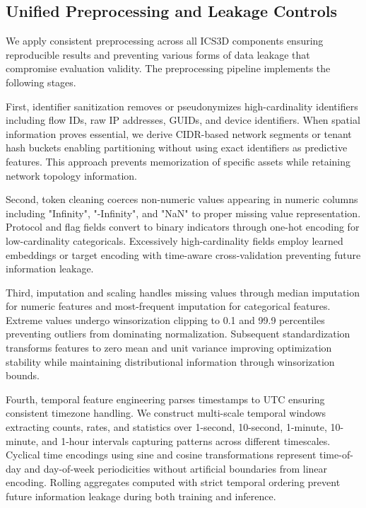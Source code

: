 \documentclass[10pt,journal,compsoc]{IEEEtran}
\begin{document}
\subsection{Unified Preprocessing and Leakage Controls}

We apply consistent preprocessing across all ICS3D components ensuring reproducible results and preventing various forms of data leakage that compromise evaluation validity. The preprocessing pipeline implements the following stages.

First, identifier sanitization removes or pseudonymizes high-cardinality identifiers including flow IDs, raw IP addresses, GUIDs, and device identifiers. When spatial information proves essential, we derive CIDR-based network segments or tenant hash buckets enabling partitioning without using exact identifiers as predictive features. This approach prevents memorization of specific assets while retaining network topology information.

Second, token cleaning coerces non-numeric values appearing in numeric columns including "Infinity", "-Infinity", and "NaN" to proper missing value representation. Protocol and flag fields convert to binary indicators through one-hot encoding for low-cardinality categoricals. Excessively high-cardinality fields employ learned embeddings or target encoding with time-aware cross-validation preventing future information leakage.

Third, imputation and scaling handles missing values through median imputation for numeric features and most-frequent imputation for categorical features. Extreme values undergo winsorization clipping to 0.1 and 99.9 percentiles preventing outliers from dominating normalization. Subsequent standardization transforms features to zero mean and unit variance improving optimization stability while maintaining distributional information through winsorization bounds.

Fourth, temporal feature engineering parses timestamps to UTC ensuring consistent timezone handling. We construct multi-scale temporal windows extracting counts, rates, and statistics over 1-second, 10-second, 1-minute, 10-minute, and 1-hour intervals capturing patterns across different timescales. Cyclical time encodings using sine and cosine transformations represent time-of-day and day-of-week periodicities without artificial boundaries from linear encoding. Rolling aggregates computed with strict temporal ordering prevent future information leakage during both training and inference.
\end{document}
